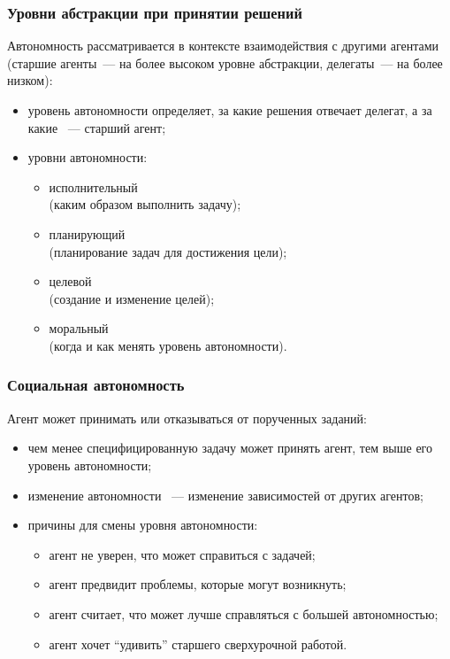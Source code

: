 \documentclass{beamer}
\begin{document}
\begin{frame}
  \frametitle{Уровни абстракции при принятии решений}
  Автономность рассматривается в контексте взаимодействия с другими агентами
  (старшие агенты~--- на более высоком уровне абстракции, делегаты~--- на более низком):
  \begin{itemize}
    \item уровень автономности определяет, за какие решения отвечает делегат, а за какие ~--- старший агент;
    \item уровни автономности:
      \begin{itemize}
        \item исполнительный \\ (каким образом выполнить задачу);
        \item планирующий \\ (планирование задач для достижения цели);
        \item целевой \\ (создание и изменение целей);
        \item моральный \\ (когда и как менять уровень автономности).
      \end{itemize}
  \end{itemize}
\end{frame}

\begin{frame}
  \frametitle{Социальная автономность}
  Агент может принимать или отказываться от порученных заданий:
  \begin{itemize}
    \item чем менее специфицированную задачу может принять агент, тем выше его уровень автономности;
    \item изменение автономности ~--- изменение зависимостей от других агентов;
    \item причины для смены уровня автономности:
      \begin{itemize}
        \item агент не уверен, что может справиться с задачей;
        \item агент предвидит проблемы, которые могут возникнуть;
        \item агент считает, что может лучше справляться с большей автономностью;
        \item агент хочет ``удивить'' старшего сверхурочной работой.
      \end{itemize}
  \end{itemize}
\end{frame}
\end{document}
